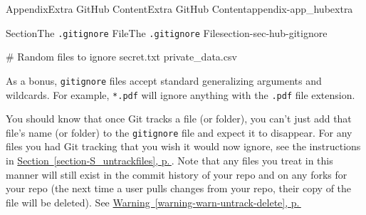 \documentclass[twoside,10pt,]{book}
\newcommand{\xreffont}{\relax}
\newcommand{\mono}[1]{\texttt{#1}}
\begin{document}
\begin{appendixptx}{Appendix}{Extra GitHub Content}{}{Extra GitHub Content}{}{}{appendix-app_hubextra}
\begin{sectionptx}{Section}{The \mono{.gitignore} File}{}{The \mono{.gitignore} File}{}{}{section-sec-hub-gitignore}
\begin{codedisplay}
# Random files to ignore
secret.txt
private_data.csv
\end{codedisplay}
%
\par
As a bonus, \mono{gitignore} files accept standard generalizing arguments and wildcards. For example, \mono{*.pdf} will ignore anything with the \mono{.pdf} file extension.%
\par
You should know that once Git tracks a file (or folder), you can't just add that file's name (or folder) to the \mono{gitignore} file and expect it to disappear. For any files you had Git tracking that you wish it would now ignore, see the instructions in \hyperref[section-S_untrackfiles]{Section~{\xreffont\ref{section-S_untrackfiles}}, p.\,\pageref{section-S_untrackfiles}}. Note that any files you treat in this manner will still exist in the commit history of your repo and on any forks for your repo (the next time a user pulls changes from your repo, their copy of the file will be deleted). See \hyperref[warning-warn-untrack-delete]{Warning~{\xreffont\ref{warning-warn-untrack-delete}}, p.\,\pageref{warning-warn-untrack-delete}}%
\end{sectionptx}
\end{appendixptx}
%
%
\typeout{************************************************}
\typeout{************************************************}
%
\end{document}
